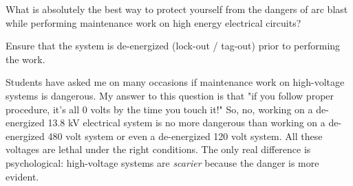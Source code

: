 

What is absolutely the best way to protect yourself from the dangers of arc blast while performing maintenance work on high energy electrical circuits?







Ensure that the system is de-energized (lock-out / tag-out) prior to performing the work.







Students have asked me on many occasions if maintenance work on high-voltage systems is dangerous.  My answer to this question is that "if you follow proper procedure, it's all 0 volts by the time you touch it!"  So, no, working on a de-energized 13.8 kV electrical system is no more dangerous than working on a de-energized 480 volt system or even a de-energized 120 volt system.  All these voltages are lethal under the right conditions.  The only real difference is psychological: high-voltage systems are {\it scarier} because the danger is more evident.




